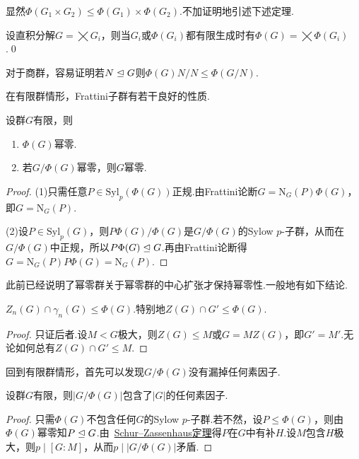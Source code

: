 显然$\Phi(G_1\times G_2)\le\Phi(G_1)\times\Phi(G_2)$.不加证明地引述下述定理.
\begin{thm}
	设直积分解$G=\bigtimes G_i$，则当$G_i$或$\Phi(G_i)$都有限生成时有$\Phi(G)=\bigtimes\Phi(G_i)$.\qed
\end{thm}

对于商群，容易证明若$N\trianglelefteq G$则$\Phi(G)N/N\le\Phi(G/N)$.

在有限群情形，Frattini子群有若干良好的性质.
\begin{prop}
	设群$G$有限，则
	\begin{enumerate}
		\item $\Phi(G)$幂零.
		\item 若$G/\Phi(G)$幂零，则$G$幂零.
	\end{enumerate}
\end{prop}
\begin{proof}
	\hspace*{5.2pt}(1)只需任意$P\in\mathrm{Syl}_p(\Phi(G))$正规.由Frattini论断$G=\mathrm{N}_G(P)\Phi(G)$，即$G=\mathrm{N}_G(P)$.

	(2)设$P\in\mathrm{Syl}_p(G)$，则$P\Phi(G)/\Phi(G)$是$G/\Phi(G)$的Sylow $p$-子群，从而在$G/\Phi(G)$中正规，所以$P\Phi(G)\trianglelefteq G$.再由Frattini论断得$G=\mathrm{N}_G(P)P\Phi(G)=\mathrm{N}_G(P)$.
\end{proof}

此前已经说明了幂零群关于幂零群的中心扩张才保持幂零性.一般地有如下结论.
\begin{prop}
	$Z_n(G)\cap\gamma_n(G)\le\Phi(G)$.特别地$Z(G)\cap G'\le\Phi(G)$.
\end{prop}
\begin{proof}
	只证后者.设$M<G$极大，则$Z(G)\le M$或$G=MZ(G)$，即$G'=M'$.无论如何总有$Z(G)\cap G'\le M$.
\end{proof}

回到有限群情形，首先可以发现$G/\Phi(G)$没有漏掉任何素因子.
\begin{prop}
	设群$G$有限，则$|G/\Phi(G)|$包含了$|G|$的任何素因子.
\end{prop}
\begin{proof}
	只需$\Phi(G)$不包含任何$G$的Sylow $p$-子群.若不然，设$P\le\Phi(G)$，则由$\Phi(G)$幂零知$P\trianglelefteq G$.由~\hyperlink{thm:SchurZassenhaus}{Schur--Zassenhaus定理}得$P$在$G$中有补$H$.设$M$包含$H$极大，则$p\mid[G:M]$，从而$p\mid|G/\Phi(G)|$矛盾.
\end{proof}


